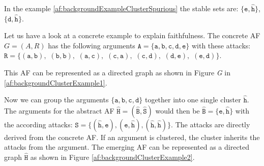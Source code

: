 In the example \ref{af:backgroundExampleClusterSpurious} the stable sets are:
$\mathtt{\{e, \hat{h}}\}$,
$\mathtt{\{d, \hat{h}}\}$.

\vspace{0.5cm}
\noindent
Let us have a look at a concrete example to explain faithfulness. The concrete AF $G = (A, R)$ has the following arguments $\mathtt{A=\{a, b, c, d, e\}}$ with these attacks:
$\mathtt{R=\{(a,b),}$
$\mathtt{(b,b),}$
$\mathtt{(a,c),}$
$\mathtt{(c,a),}$
$\mathtt{(c,d),}$
$\mathtt{(d,e),}$
$\mathtt{(e,d)\}}$.

This AF can be represented as a directed graph as shown in Figure \textit{G} in \ref{af:backgroundClusterExample1}.

Now we can group the arguments $\mathtt{\{a, b, c, d\}}$ together into one single cluster $\mathtt{\hat{h}}$. The arguments for the abstract AF $\mathtt{\hat{H} = (\hat{B}, \hat{S})}$ would then be $\mathtt{\hat{B}=\{e, \hat{h}\}}$ with the according attacks:
$\mathtt{\hat{S}=\{(\hat{h}, e), (e, \hat{h}), (\hat{h}, \hat{h})\}}$. The attacks are directly derived from the concrete AF. If an argument is clustered, the cluster inherits the attacks from the argument. The emerging AF can be represented as a directed graph $\mathtt{\hat{H}}$ as shown in Figure \ref{af:backgroundClusterExample2}.


